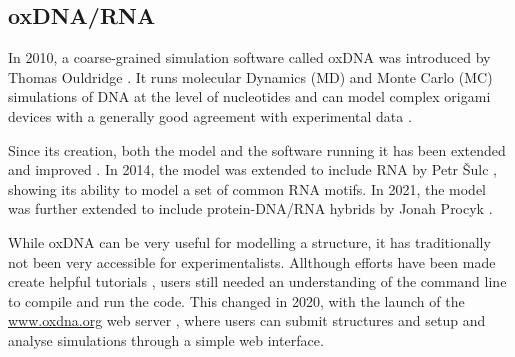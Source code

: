 \subsection{oxDNA/RNA}
\label{sec:oxDNA}


In 2010, a coarse-grained simulation software called oxDNA was introduced by Thomas Ouldridge \cite{ouldridge2010dna}. It runs molecular Dynamics (MD) and Monte Carlo (MC) simulations of DNA at the level of nucleotides and can model complex origami devices with a generally good agreement with experimental data \cite{sharma2017characterizing}.

Since its creation, both the model and the software running it has been extended and improved \cite{ouldridge2011structural, rovigatti2015comparison, sulc2012Sequence, ouldridge2013optimizing, snodin2015introducing}. In 2014, the model was extended to include RNA by Petr {\v{S}}ulc \cite{vsulc2014nucleotide}, showing its ability to model a set of common RNA motifs. In 2021, the model was further extended to include protein-DNA/RNA hybrids by Jonah Procyk \cite{procyk2021coarse}.





While oxDNA can be very useful for modelling a structure, it has traditionally not been very accessible for experimentalists. Allthough efforts have been made create helpful tutorials \cite{doye2020oxdna}, users still needed an understanding of the command line to compile and run the code. This changed in 2020, with the launch of the \url{www.oxdna.org} web server \cite{oxdna.org}, where users can submit structures and setup and analyse simulations through a simple web interface.

